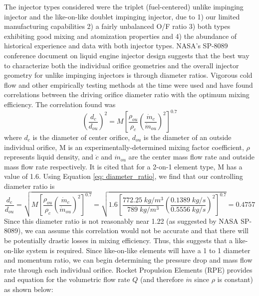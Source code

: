 \documentclass[9pt]{article} %
\numberwithin{equation}{section} %
\begin{document}
\hspace{\parindent} The injector types considered were the triplet (fuel-centered) unlike impinging injector and the like-on-like doublet impinging injector, due to 1) our limited manufacturing capabilities 2) a fairly unbalanced O/F ratio 3) both types exhibiting good mixing and atomization properties and 4) the abundance of historical experience and data with both injector types. NASA's SP-8089 conference document on liquid engine injector design suggests that the best way to characterize both the individual orifice geometries and the overall injector geometry for unlike impinging injectors is through diameter ratios. Vigorous cold flow and other empirically testing methods at the time were used and have found correlations between the driving orifice diameter ratio with the optimum mixing efficiency. The correlation found was
\begin{equation} \label{eq: diameter_ratio}
    \left( \frac{d_{c}}{d_{ou}} \right)^{2} = M \left[ \frac{\rho_{ou}}{\rho_{c}} \left( \frac{\dot{m}_{c}}{\dot{m}_{ou}} \right)^{2} \right]^{0.7}
\end{equation}
where $d_{c}$ is the diameter of center orifice, $d_{ou}$ is the diameter of an outside individual orifice, M is an experimentally-determined mixing factor coefficient, $\rho$ represents liquid density, and $\dot{c}$ and $\dot{m}_{ou}$ are the center mass flow rate and outside mass flow rate respectively. It is cited that for a 2-on-1 element type, M has a value of 1.6. Using Equation \ref{eq: diameter_ratio}, we find that our controlling diameter ratio is
\begin{equation*}
    \frac{d_{c}}{d_{ou}} = \sqrt{M \left[ \frac{\rho_{ou}}{\rho_{c}} \left( \frac{\dot{m}_{c}}{\dot{m}_{ou}} \right)^{2} \right]^{0.7}} = \sqrt{1.6 \left[ \frac{772.25 \; kg/m^{3}}{789 \; kg/m^{3}} \left( \frac{0.1389 \; kg/s}{0.5556 \; kg/s} \right)^{2} \right]^{0.7}} = 0.4757
\end{equation*}
Since this diameter ratio is not reasonably near 1.22 (as suggested by NASA SP-8089), we can assume this correlation would not be accurate and that there will be potentially drastic losses in mixing efficiency. Thus, this suggests that a like-on-like system is required. Since like-on-like elements will have a 1 to 1 diameter and momentum ratio, we can begin determining the pressure drop and mass flow rate through each individual orifice. Rocket Propulsion Elements (RPE) provides and equation for the volumetric flow rate $Q$ (and therefore $\dot{m}$ since $\rho$ is constant) as shown below:
\end{document}
